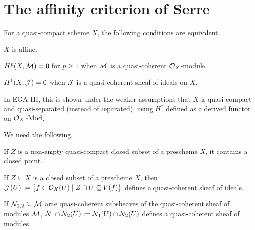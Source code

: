 \documentclass[a4paper,parskip=half,numbers=enddot, DIV=12]{scrreprt}
\begin{document}
\section{The affinity criterion of Serre}
\begin{prop}
	For a quasi-compact scheme $X$, the following conditions are equivalent.
	\begin{alphanumerate}
		\item $X$ is affine.
		\item $H^p(X,\mathcal{M})=0$ for $p\geq 1$ when $\mathcal{M}$ is a quasi-coherent $\mathcal{O}_X$-module.
		\item $H^1(X,\mathcal{J})=0$ when $\mathcal{J}$ is a quasi-coherent sheaf of ideals on $X$.
	\end{alphanumerate}
\end{prop}
\begin{rem*}
	In EGA III, this is shown under the weaker assumptions that $X$ is quasi-compact and quasi-separated (instead of separated), using $H^*$ defined as a derived functor on $\mathcal{O}_X\operatorname{-Mod}$.
\end{rem*}
We need the following.
\begin{prop}
	\begin{alphanumerate}
		\item{} If $Z$ is a non-empty quasi-compact closed subset of a prescheme $X$, it contains a closed point.
		\item{} If $Z\subseteq X$ is a closed subset of a prescheme $X$, then $\mathcal{J}(U) := \{f \in \mathcal{O}_X(U) \mid Z\cap U \subseteq V(f)\}$
defines a quasi-coherent sheaf of ideals.
	\item{} If $\mathcal{N}_{1,2}\subseteq \mathcal{M}$ arae quasi-coherent subsheaves of the quasi-coherent sheaf of modules $\mathcal{M}$, $\mathcal{N}_1 \cap \mathcal{N}_2(U) := \mathcal{N}_1(U)\cap
\mathcal{N}_2(U)$ defines a quasi-coherent sheaf of modules.
	\end{alphanumerate}
\end{prop}
\end{document}
